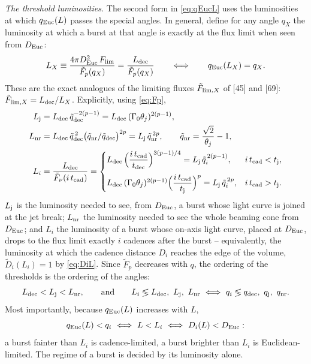\documentclass[11pt,a4paper]{article}
\newcommand{\tq}{\tilde{q}}
\newcommand{\tD}{\tilde{D}}
\newcommand{\tF}{\tilde{F}}
\newcommand{\Euc}{{\rm Euc}}
\newcommand{\dec}{{\rm dec}}
\newcommand{\nr}{{\rm nr}}
\newcommand{\Flim}{F_{\rm lim}}
\newcommand{\tcad}{t_{\rm cad}}
\newcommand{\tdec}{t_{\rm dec}}
\newcommand{\tj}{t_{\rm j}}
\newcommand{\Ldec}{L_{\rm dec}}
\newcommand{\Lj}{L_{\rm j}}
\newcommand{\Lnr}{L_{\rm nr}}
\begin{document}
\noindent\emph{The threshold luminosities.} The second form in \eqref{eq:qEucL} uses the luminosities at which $q_\Euc(L)$ passes the special angles. In general, define for any angle $q_X$ the luminosity at which a burst at that angle is exactly at the flux limit when seen from $D_\Euc$:
\begin{equation}
\label{eq:LX}
L_X\equiv\frac{4\pi D_\Euc^2\,\Flim}{\tF_p(q_X)}=\frac{\Ldec}{\tF_p(q_X)}\qquad\Longleftrightarrow\qquad q_\Euc(L_X)=q_X .
\end{equation}
These are the exact analogues of the limiting fluxes $\tF_{{\rm lim},X}$ of [45] and [69]: $\tF_{{\rm lim},X}=\Ldec/L_X$. Explicitly, using \eqref{eq:Fp},
\begin{align}
\Lj&=\Ldec\,\tq_\dec^{-2(p-1)}=\Ldec\,(\Gamma_0\theta_j)^{2(p-1)},\label{eq:Lj}\\
\Lnr&=\Ldec\,\tq_\dec^{\,2}\bigl(\tq_\nr/\tq_\dec\bigr)^{2p}=\Lj\,\tq_\nr^{\,2p},\qquad \tq_\nr=\frac{\sqrt2}{\theta_j}-1,\label{eq:Lnr}\\
L_i&=\frac{\Ldec}{\tF_\nu(i\,\tcad)}=\begin{cases}\Ldec\,\Bigl(\dfrac{i\,\tcad}{\tdec}\Bigr)^{3(p-1)/4}=\Lj\,\tq_i^{\,2(p-1)}, & i\,\tcad<\tj,\\[10pt] \Ldec\,(\Gamma_0\theta_j)^{2(p-1)}\Bigl(\dfrac{i\,\tcad}{\tj}\Bigr)^{p}=\Lj\,\tq_i^{\,2p}, & i\,\tcad>\tj .\end{cases}\label{eq:Li}
\end{align}
$\Lj$ is the luminosity needed to see, from $D_\Euc$, a burst whose light curve is joined at the jet break; $\Lnr$ the luminosity needed to see the whole beaming cone from $D_\Euc$; and $L_i$ the luminosity of a burst whose on-axis light curve, placed at $D_\Euc$, drops to the flux limit exactly $i$ cadences after the burst -- equivalently, the luminosity at which the cadence distance $D_i$ reaches the edge of the volume, $\tD_i(L_i)=1$ by \eqref{eq:DiL}. Since $\tF_p$ decreases with $q$, the ordering of the thresholds is the ordering of the angles:
\begin{equation}
\Ldec<\Lj<\Lnr,\qquad\text{and}\qquad L_i\lessgtr\Ldec,\ \Lj,\ \Lnr\ \Longleftrightarrow\ q_i\lessgtr q_\dec,\ q_{\rm j},\ q_\nr .
\end{equation}
Most importantly, because $q_\Euc(L)$ increases with $L$,
\begin{equation}
\label{eq:switch}
q_\Euc(L)<q_i\ \Longleftrightarrow\ L<L_i\ \Longleftrightarrow\ D_i(L)<D_\Euc :
\end{equation}
a burst fainter than $L_i$ is cadence-limited, a burst brighter than $L_i$ is Euclidean-limited. The regime of a burst is decided by its luminosity alone.
\end{document}
